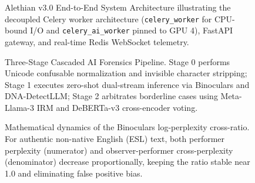 
\begin{figure}[htbp]
    \centering
    
    \caption{Alethian v3.0 End-to-End System Architecture illustrating the decoupled Celery worker architecture (\texttt{celery\_worker} for CPU-bound I/O and \texttt{celery\_ai\_worker} pinned to GPU 4), FastAPI gateway, and real-time Redis WebSocket telemetry.}
    \label{fig:system_architecture}
\end{figure}

\begin{figure}[htbp]
    \centering
    
    \caption{Three-Stage Cascaded AI Forensics Pipeline. Stage 0 performs Unicode confusable normalization and invisible character stripping; Stage 1 executes zero-shot dual-stream inference via Binoculars and DNA-DetectLLM; Stage 2 arbitrates borderline cases using Meta-Llama-3 IRM and DeBERTa-v3 cross-encoder voting.}
    \label{fig:ai_forensics_pipeline}
\end{figure}

\begin{figure}[htbp]
    \centering
    
    \caption{Mathematical dynamics of the Binoculars log-perplexity cross-ratio. For authentic non-native English (ESL) text, both performer perplexity (numerator) and observer-performer cross-perplexity (denominator) decrease proportionally, keeping the ratio stable near 1.0 and eliminating false positive bias.}
    \label{fig:dual_stream_binoculars}
\end{figure}

